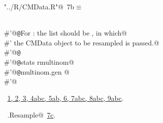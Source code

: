 \documentclass[reqno]{amsart}
\renewcommand{\NWtarget}[2]{\hypertarget{#1}{#2}}
\renewcommand{\NWlink}[2]{\hyperlink{#1}{#2}}
\begin{document}
\begin{flushleft} \small\label{scrap11}\raggedright\small
\NWtarget{nuweb7b}{} \verb@"../R/CMData.R"@\nobreak\ {\footnotesize {7b}}$\equiv$
\vspace{-1ex}
\begin{list}{}{} \item
\mbox{}\verb@@\\
\mbox{}\verb@#'@{\tt @}\verb@details For : the  list should be , in which@\\
\mbox{}\verb@#' the CMData object to be resampled is passed.@\\
\mbox{}\verb@#'@{\tt @}\verb@export@\\
\mbox{}\verb@#'@{\tt @}\verb@importFrom stats rmultinom@\\
\mbox{}\verb@#'@{\tt @}\verb@rdname multinom.gen @\\
\mbox{}\verb@#'@\\
\mbox{}\verb@@{\NWsep}
\end{list}
\vspace{-1.5ex}
\footnotesize
\begin{list}{}{\setlength{\itemsep}{-\parsep}\setlength{\itemindent}{-\leftmargin}}
\item \NWtxtFileDefBy\ \NWlink{nuweb1}{1}\NWlink{nuweb2}{, 2}\NWlink{nuweb3}{, 3}\NWlink{nuweb4a}{, 4a}\NWlink{nuweb4b}{b}\NWlink{nuweb4c}{c}\NWlink{nuweb5a}{, 5a}\NWlink{nuweb5b}{b}\NWlink{nuweb6}{, 6}\NWlink{nuweb7a}{, 7a}\NWlink{nuweb7b}{b}\NWlink{nuweb7c}{c}\NWlink{nuweb8a}{, 8a}\NWlink{nuweb8b}{b}\NWlink{nuweb8c}{c}\NWlink{nuweb9a}{, 9a}\NWlink{nuweb9b}{b}\NWlink{nuweb9c}{c}.
\item \NWtxtIdentsUsed\nobreak\  \verb@mg.Resample@\nobreak\ \NWlink{nuweb7c}{7c}.
\item{}
\end{list}
\vspace{4ex}
\end{flushleft}
\end{document}
